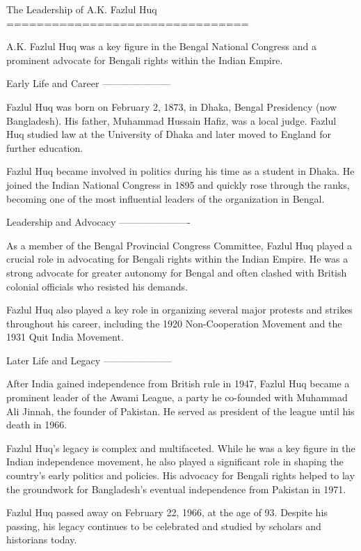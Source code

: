 The Leadership of A.K. Fazlul Huq
================================

A.K. Fazlul Huq was a key figure in the Bengal National Congress and a prominent advocate for Bengali rights within the Indian Empire.

Early Life and Career
---------------------

Fazlul Huq was born on February 2, 1873, in Dhaka, Bengal Presidency (now Bangladesh). His father, Muhammad Hussain Hafiz, was a local judge. Fazlul Huq studied law at the University of Dhaka and later moved to England for further education.

Fazlul Huq became involved in politics during his time as a student in Dhaka. He joined the Indian National Congress in 1895 and quickly rose through the ranks, becoming one of the most influential leaders of the organization in Bengal.

Leadership and Advocacy
----------------------

As a member of the Bengal Provincial Congress Committee, Fazlul Huq played a crucial role in advocating for Bengali rights within the Indian Empire. He was a strong advocate for greater autonomy for Bengal and often clashed with British colonial officials who resisted his demands.

Fazlul Huq also played a key role in organizing several major protests and strikes throughout his career, including the 1920 Non-Cooperation Movement and the 1931 Quit India Movement.

Later Life and Legacy
---------------------

After India gained independence from British rule in 1947, Fazlul Huq became a prominent leader of the Awami League, a party he co-founded with Muhammad Ali Jinnah, the founder of Pakistan. He served as president of the league until his death in 1966.

Fazlul Huq's legacy is complex and multifaceted. While he was a key figure in the Indian independence movement, he also played a significant role in shaping the country's early politics and policies. His advocacy for Bengali rights helped to lay the groundwork for Bangladesh's eventual independence from Pakistan in 1971.

Fazlul Huq passed away on February 22, 1966, at the age of 93. Despite his passing, his legacy continues to be celebrated and studied by scholars and historians today.